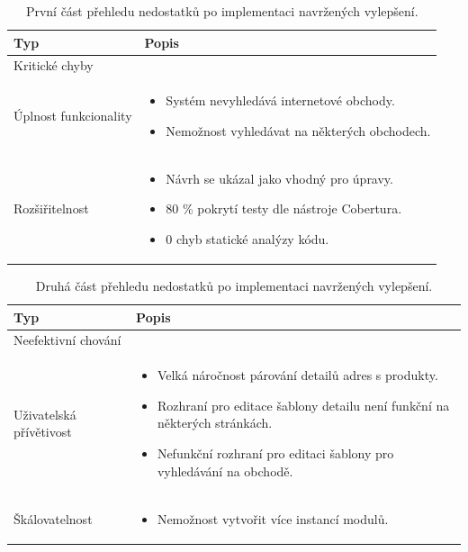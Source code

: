 \documentclass[thesis=B,czech]{FITthesis}[2012/06/26]
\begin{document}
\begin{table}[h]\centering
    \begin{tabular}{ | l | p{7cm} |}
    \hline
    Typ & Popis \\ \hline
    Kritické chyby & 
  		 \\ \hline
	\hline
    Úplnost funkcionality & 
    	\begin{itemize}
  			\item Systém nevyhledává internetové obchody.
  			\item Nemožnost vyhledávat na některých obchodech.
  		\end{itemize} \\ \hline
	\hline
	Rozšiřitelnost  & 
		\begin{itemize}
  			\item Návrh se ukázal jako vhodný pro úpravy.
  			\item 80 \% pokrytí testy dle nástroje Cobertura.
  			\item 0 chyb statické analýzy kódu.
  		\end{itemize} \\ \hline
    \end{tabular}
	\caption{První část přehledu nedostatků po implementaci navržených vylepšení.}
	  \label{table:analysis-new1}
\end{table}
\begin{table}[h]\centering
    \begin{tabular}{ | l | p{7cm} |}  
    \hline
    Typ & Popis \\ \hline
	Neefektivní chování & 
	 \\ \hline	
	\hline
	Uživatelská přívětivost & 
		\begin{itemize}
  			\item Velká náročnost párování detailů adres s produkty.
  			\item Rozhraní pro editace šablony detailu není funkční na některých stránkách.
  			\item Nefunkční rozhraní pro editaci šablony pro vyhledávání na obchodě.
  		\end{itemize} \\ \hline	
	\hline
	Škálovatelnost & 
		\begin{itemize}
  			\item Nemožnost vytvořit více instancí modulů.
  		\end{itemize} \\ \hline
    \end{tabular}
	\caption{Druhá část přehledu nedostatků po implementaci navržených vylepšení.}
	\label{table:analysis-new2}
\end{table}
\end{document}
